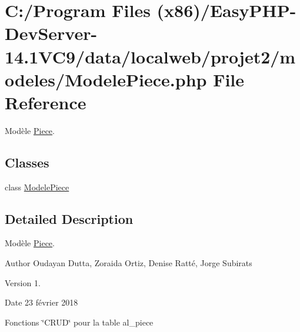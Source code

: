 \hypertarget{_modele_piece_8php}{}\section{C\+:/\+Program Files (x86)/\+Easy\+P\+H\+P-\/\+Dev\+Server-\/14.1\+V\+C9/data/localweb/projet2/modeles/\+Modele\+Piece.php File Reference}
\label{_modele_piece_8php}


Modèle \hyperlink{class_piece}{Piece}.  


\subsection*{Classes}
\begin{DoxyCompactItemize}
\item 
class \hyperlink{class_modele_piece}{Modele\+Piece}
\end{DoxyCompactItemize}


\subsection{Detailed Description}
Modèle \hyperlink{class_piece}{Piece}. 

\begin{DoxyAuthor}{Author}
Oudayan Dutta, Zoraida Ortiz, Denise Ratté, Jorge Subirats 
\end{DoxyAuthor}
\begin{DoxyVersion}{Version}
1. 
\end{DoxyVersion}
\begin{DoxyDate}{Date}
23 février 2018
\end{DoxyDate}
Fonctions \char`\"{}\+C\+R\+U\+D\char`\"{} pour la table al\+\_\+piece 